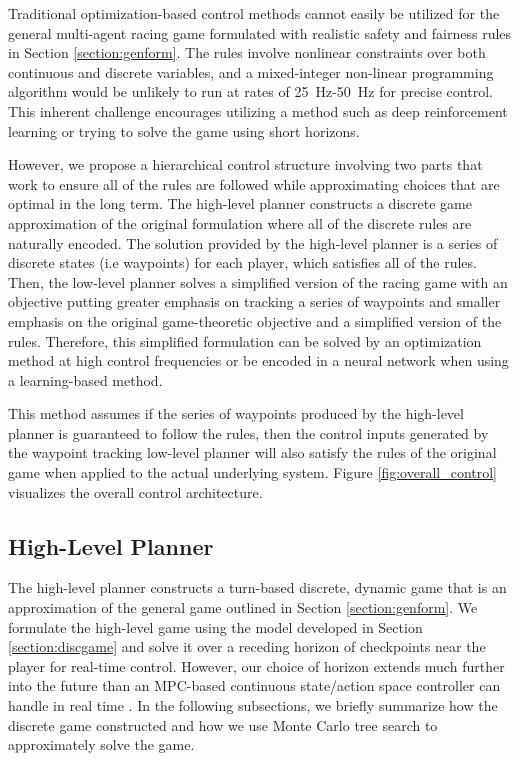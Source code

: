Traditional optimization-based control methods cannot easily be utilized for the general multi-agent racing game formulated with realistic safety and fairness rules in Section \ref{section:genform}. The rules involve nonlinear constraints over both continuous and discrete variables, and a mixed-integer non-linear programming algorithm would be unlikely to run at rates of \SI{25}{\hertz}-\SI{50}{\hertz} for precise control. This inherent challenge encourages utilizing a method such as deep reinforcement learning or trying to solve the game using short horizons. 

However, we propose a hierarchical control structure involving two parts that work to ensure all of the rules are followed while approximating choices that are optimal in the long term. The high-level planner constructs a discrete game approximation of the original formulation where all of the discrete rules are naturally encoded. The solution provided by the high-level planner is a series of discrete states (i.e waypoints) for each player, which satisfies all of the rules. Then, the low-level planner solves a simplified version of the racing game with an objective putting greater emphasis on tracking a series of waypoints and smaller emphasis on the original game-theoretic objective and a simplified version of the rules. Therefore, this simplified formulation can be solved by an optimization method at high control frequencies or be encoded in a neural network when using a learning-based method. 

This method assumes if the series of waypoints produced by the high-level planner is guaranteed to follow the rules, then the control inputs generated by the waypoint tracking low-level planner will also satisfy the rules of the original game when applied to the actual underlying system. Figure \ref{fig:overall_control} visualizes the overall control architecture. 

\subsection{High-Level Planner}
The high-level planner constructs a turn-based discrete, dynamic game that is an approximation of the general game outlined in Section \ref{section:genform}. We formulate the high-level game using the model developed in Section \ref{section:discgame} and solve it over a receding horizon of checkpoints near the player for real-time control. However, our choice of horizon extends much further into the future than an MPC-based continuous state/action space controller can handle in real time \cite{Wang2019}. In the following subsections, we briefly summarize how the discrete game constructed and how we use Monte Carlo tree search to approximately solve the game.

